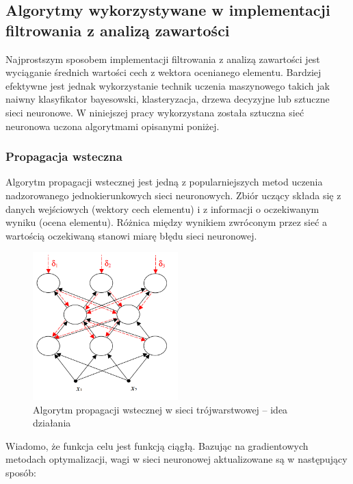 \documentclass[twoside]{iisthesis}
\begin{document}
	 \subsection{Algorytmy wykorzystywane w implementacji filtrowania z analizą zawartości}
	 
	 Najprostszym sposobem implementacji filtrowania z analizą zawartości jest wyciąganie średnich wartości cech z wektora ocenianego elementu. Bardziej efektywne jest jednak wykorzystanie technik uczenia maszynowego takich jak naiwny klasyfikator bayesowski, klasteryzacja, drzewa decyzyjne lub sztuczne sieci neuronowe. W niniejszej pracy wykorzystana została sztuczna sieć neuronowa uczona algorytmami opisanymi poniżej. 
	 
	 \subsubsection{Propagacja wsteczna}
	 \label{sss:backprop}
	 
	 Algorytm propagacji wstecznej jest jedną z popularniejszych metod uczenia nadzorowanego jednokierunkowych sieci neuronowych. Zbiór uczący składa się z danych wejściowych (wektory cech elementu) i z informacji o oczekiwanym wyniku (ocena elementu). Różnica między wynikiem zwróconym przez sieć a wartością oczekiwaną stanowi miarę błędu sieci neuronowej. 
	 
	 \begin{figure}[!ht] 
			 	\centering
			 	\includegraphics[width=0.5\textwidth]{ilustracjabackprop}
			 	\caption{Algorytm propagacji wstecznej w sieci trójwarstwowej -- idea działania \protect\cite{kwateralgorytmy}}
			 	\label{fig:ilustracjabackprop}
	 \end{figure}
	 
	 Wiadomo, że funkcja celu jest funkcją ciągłą. Bazując na gradientowych metodach optymalizacji, wagi w sieci neuronowej aktualizowane są w następujący sposób:	 
	 
\end{document}
